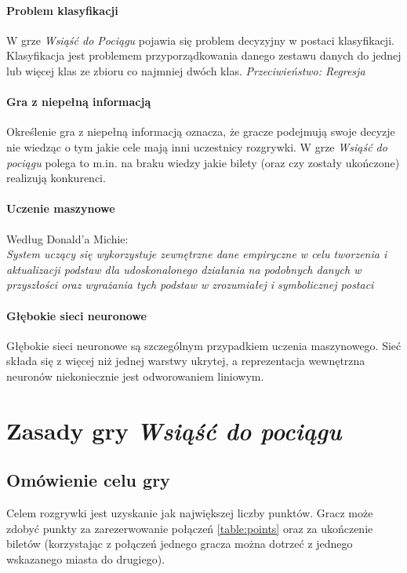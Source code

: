 \documentclass[12pt, oneside]{report}
\begin{document}
\paragraph{Problem klasyfikacji}
W grze \textit{Wsiąść do Pociągu} pojawia się problem decyzyjny w postaci klasyfikacji. Klasyfikacja jest problemem przyporządkowania danego zestawu danych do jednej lub więcej klas ze zbioru co najmniej dwóch klas. \textit{Przeciwieństwo: Regresja}
\paragraph{Gra z niepełną informacją} 
Określenie gra z niepełną informacją oznacza, że gracze podejmują swoje decyzje nie wiedząc o tym jakie cele mają inni uczestnicy rozgrywki. W grze \textit{Wsiąść do pociągu} polega to m.in. na braku wiedzy jakie bilety (oraz czy zostały ukończone) realizują konkurenci.
\paragraph{Uczenie maszynowe}
Według Donald'a Michie: \\ \textit{System uczący się wykorzystuje zewnętrzne dane empiryczne w celu tworzenia i aktualizacji podstaw dla udoskonalonego działania na podobnych danych w przyszłości oraz wyrażania tych podstaw w zrozumiałej i symbolicznej postaci}
\paragraph{Głębokie sieci neuronowe}
Głębokie sieci neuronowe są szczególnym przypadkiem uczenia maszynowego. Sieć składa się z więcej niż jednej warstwy ukrytej, a reprezentacja wewnętrzna neuronów niekoniecznie jest odworowaniem liniowym.
\section{Zasady gry \textit{Wsiąść do pociągu}}
\subsection{Omówienie celu gry}
Celem rozgrywki jest uzyskanie jak największej liczby punktów. Gracz może zdobyć punkty za zarezerwowanie połączeń \ref{table:points} oraz za ukończenie biletów (korzystając z połączeń jednego gracza można dotrzeć z jednego wskazanego miasta do drugiego). 
\end{document}
